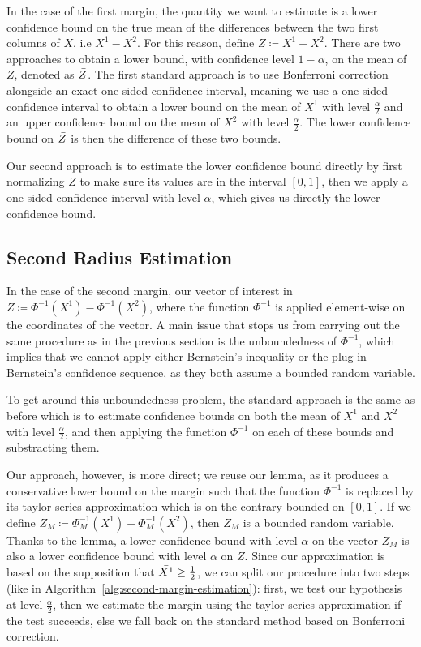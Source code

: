 In the case of the first margin, the quantity we want to estimate is a lower confidence bound on the true mean of the differences between the two first columns of $X$, i.e $X^{1}-X^{2}$.
For this reason, define $Z\coloneqq X^{1}-X^{2}$.
There are two approaches to obtain a lower bound, with confidence level $1-\alpha$, on the mean of $Z$, denoted as $\Bar{Z}$.
The first standard approach is to use Bonferroni correction alongside an exact one-sided confidence interval, meaning we use a one-sided confidence interval to obtain a lower bound on the mean of $X^1$ with level $\frac{\alpha}{2}$ and an upper confidence bound on the mean of $X^2$ with level $\frac{\alpha}{2}$.
The lower confidence bound on $\Bar{Z}$ is then the difference of these two bounds.

Our second approach is to estimate the lower confidence bound directly by first normalizing $Z$ to make sure its values are in the interval $[0,1]$, then we apply a one-sided confidence interval with level $\alpha$, which gives us directly the lower confidence bound.

\subsection{Second Radius Estimation}\label{subsec:second-radius-estimation-continuous}
In the case of the second margin, our vector of interest in $Z\coloneqq\Phi^{-1}(X^1)-\Phi^{-1}(X^2)$, where the function $\Phi^{-1}$ is applied element-wise on the coordinates of the vector.
A main issue that stops us from carrying out the same procedure as in the previous section is the unboundedness of $\Phi^{-1}$, which implies that we cannot apply either Bernstein's inequality or the plug-in Bernstein's confidence sequence, as they both assume a bounded random variable.

To get around this unboundedness problem, the standard approach is the same as before which is to estimate confidence bounds on both the mean of $X^1$ and $X^2$ with level $\frac{\alpha}{2}$, and then applying the function $\Phi^{-1}$ on each of these bounds and substracting them.

Our approach, however, is more direct; we reuse our lemma, as it produces a conservative lower bound on the margin such that the function $\Phi^{-1}$ is replaced by its taylor series approximation which is on the contrary bounded on $[0,1]$.
If we define $Z_M\coloneqq\Phi^{-1}_M(X^1)-\Phi^{-1}_M(X^2)$, then $Z_M$ is a bounded random variable.
Thanks to the lemma, a lower confidence bound with level $\alpha$ on the vector $Z_M$ is also a lower confidence bound with level $\alpha$ on $Z$.
Since our approximation is based on the supposition that $\Bar{X^1}\geq\frac{1}{2}$, we can split our procedure into two steps (like in Algorithm~\ref{alg:second-margin-estimation}): first, we test our hypothesis at level $\frac{\alpha}{2}$, then we estimate the margin using the taylor series approximation if the test succeeds, else we fall back on the standard method based on Bonferroni correction.



